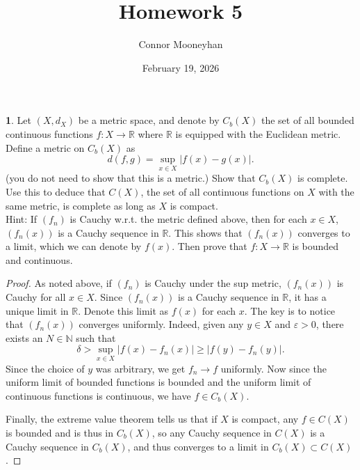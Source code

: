 \documentclass[12pt]{article}
\title{Homework 5}
\author{Connor Mooneyhan}
\date{February 19, 2026}
\theoremstyle{definition}
\newtheorem{ex}{}
\begin{document}
\maketitle

\begin{ex}
	Let $(X, d_X)$ be a metric space, and denote by $C_b(X)$ the set of all bounded continuous functions $f : X \to \mathbb{R}$ where $\mathbb{R}$ is equipped with the Euclidean metric.
	Define a metric on $C_b(X)$ as \begin{equation*}
		d(f, g) = \sup_{x \in X} |f(x) - g(x)|.
	\end{equation*}
	(you do not need to show that this is a metric.)
	Show that $C_b(X)$ is complete.
	Use this to deduce that $C(X)$, the set of all continuous functions on $X$ with the same metric, is complete as long as $X$ is compact.
	\\
	Hint: If $(f_n)$ is Cauchy w.r.t. the metric defined above, then for each $x \in X$, $(f_n(x))$ is a Cauchy sequence in $\mathbb{R}$.
	This shows that $(f_n(x))$ converges to a limit, which we can denote by $f(x)$.
	Then prove that $f: X \to \mathbb{R}$ is bounded and continuous.
\end{ex}
\begin{proof}
	As noted above, if $(f_n)$ is Cauchy under the sup metric, $(f_n(x))$ is Cauchy for all $x \in X$.
	Since $(f_n(x))$ is a Cauchy sequence in $\mathbb{R}$, it has a unique limit in $\mathbb{R}$.
	Denote this limit as $f(x)$ for each $x$.
	The key is to notice that $(f_n(x))$ converges uniformly.
	Indeed, given any $y \in X$ and $\varepsilon > 0$, there exists an $N \in \mathbb{N}$ such that \begin{equation*}
		\delta > \sup_{x \in X} |f(x) - f_n(x)| \geq |f(y) - f_n(y)|.
	\end{equation*}
	Since the choice of $y$ was arbitrary, we get $f_n \to f$ uniformly.
	Now since the uniform limit of bounded functions is bounded and the uniform limit of continuous functions is continuous, we have $f \in C_b(X)$.

	Finally, the extreme value theorem tells us that if $X$ is compact, any $f \in C(X)$ is bounded and is thus in $C_b(X)$, so any Cauchy sequence in $C(X)$ is a Cauchy sequence in $C_b(X)$, and thus converges to a limit in $C_b(X) \subset C(X)$.
\end{proof}
\end{document}
